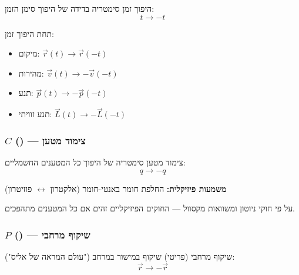 \begin{definitionbox}{היפוך זמן}
סימטריה בדידה של היפוך סימן הזמן:
\[
t \to -t
\]

תחת היפוך זמן:
\begin{itemize}
    \item מיקום: $\vec{r}(t) \to \vec{r}(-t)$
    \item מהירות: $\vec{v}(t) \to -\vec{v}(-t)$
    \item תנע: $\vec{p}(t) \to -\vec{p}(-t)$
    \item תנע זוויתי: $\vec{L}(t) \to -\vec{L}(-t)$
\end{itemize}
\end{definitionbox}

\subsubsection*{$C$ () — צימוד מטען}

\begin{definitionbox}{צימוד מטען}
סימטריה של היפוך כל המטענים החשמליים:
\[
q \to -q
\]

\textbf{משמעות פיזיקלית:} החלפת חומר באנטי-חומר (אלקטרון $\leftrightarrow$ פוזיטרון)

על פי חוקי ניוטון ומשוואות מקסוול — החוקים הפיזיקליים זהים אם כל המטענים מתהפכים.
\end{definitionbox}

\subsubsection*{$P$ () — שיקוף מרחבי}

\begin{definitionbox}{שיקוף מרחבי (פריטי)}
שיקוף במישור במרחב ("עולם המראה של אליס"):
\[
\vec{r} \to -\vec{r}
\]
\end{definitionbox}

